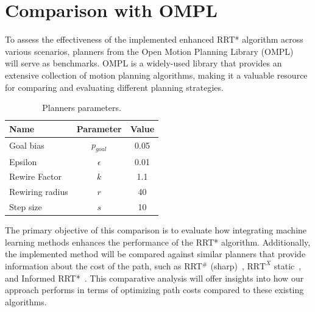\documentclass{ctuthesis}
\begin{document}
\section{Comparison with OMPL}
To assess the effectiveness of the implemented enhanced RRT* algorithm across various scenarios, 
planners from the Open Motion Planning Library (OMPL)~\cite{Ioan2012ompl} 
will serve as benchmarks. 
OMPL is a widely-used library that provides an extensive collection of motion planning algorithms,
making it a valuable resource for comparing and evaluating different planning strategies. 
\begin{table}[!ht]
  \centering
  \begin{tabular}{|p{3cm}|c|c|}
      \hline
      \textbf{Name} & \textbf{Parameter} & \textbf{Value}\\
      \hline
      Goal bias       & $p_{goal}$ & 0.05 \\
      Epsilon         & $\epsilon$ & 0.01 \\
      Rewire Factor   & $k$        & 1.1  \\
      Rewiring radius & $r$        & 40   \\
      Step size       & $s$        & 10   \\
      \hline
  \end{tabular}
  \caption{Planners parameters.}
  \label{tab:params}
\end{table}
The primary objective of this comparison is to evaluate how integrating 
machine learning methods enhances the performance of the RRT* algorithm. 
Additionally, 
the implemented method will be compared against similar planners that provide 
information about the cost of the path, 
such as RRT$^\#$ (sharp)~\cite{arslan2012rrtsharp}, $\text{RRT}^X$ static~\cite{Otte2015RRTX}, 
and Informed RRT*~\cite{Gammell2018InformedRRTstar}. 
This comparative analysis will offer insights into how our approach 
performs in terms of optimizing path costs compared to these existing algorithms. 

\end{document}
